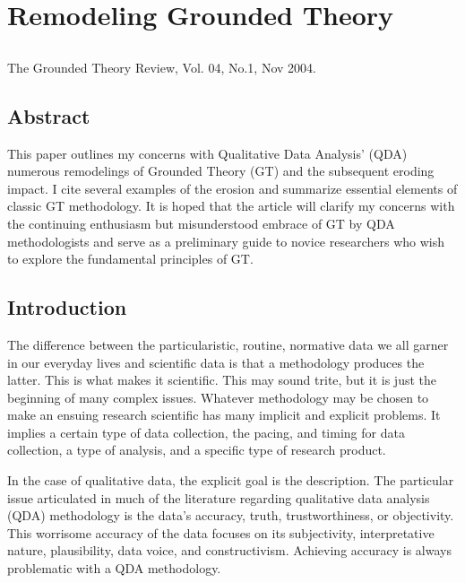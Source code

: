 
\chapter{Remodeling Grounded Theory}
\section*{\citeauthor{article.glaser04}}
The Grounded Theory Review, Vol. 04, No.1, Nov 2004.
\section*{Abstract}

This paper outlines my concerns with Qualitative Data Analysis' (QDA)
numerous remodelings of Grounded Theory (GT) and the subsequent eroding
impact. I cite several examples of the erosion and summarize essential
elements of classic GT methodology. It is hoped that the article will clarify my
concerns with the continuing enthusiasm but misunderstood embrace of GT by
QDA methodologists and serve as a preliminary guide to novice researchers
who wish to explore the fundamental principles of GT.

\section*{Introduction}

The difference between the particularistic, routine, normative data we all garner
in our everyday lives and scientific data is that a methodology produces the latter.
This is what makes it scientific.
This may sound trite, but it is just the beginning of many complex issues.
Whatever methodology may be chosen to make an ensuing research
scientific has many implicit and explicit problems.
It implies a certain type of data collection,
the pacing, and timing for data collection, a type of analysis,
and a specific type of research product.

In the case of qualitative data, the explicit goal is the description.
The particular issue articulated in much of the literature regarding
qualitative data analysis (QDA) methodology is the data's accuracy,
truth, trustworthiness, or objectivity.
This worrisome accuracy of the data focuses on its subjectivity, interpretative nature,
plausibility, data voice, and constructivism.
Achieving accuracy is always problematic with a QDA methodology.


